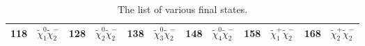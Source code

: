 \begin{table}[ht]
{\begin{tabular}{cccccccccccc}
            118 & $\widetilde{\chi}^{0}_{1} \widetilde{\chi}^{-}_{2}$ & 128 & $\widetilde{\chi}^{0}_{2} \widetilde{\chi}^{-}_{2}$ & 138 & $\widetilde{\chi}^{0}_{3} \widetilde{\chi}^{-}_{2}$ & 148 & $\widetilde{\chi}^{0}_{4} \widetilde{\chi}^{-}_{2}$ & 158 & $\widetilde{\chi}^{+}_{1} \widetilde{\chi}^{-}_{2}$ & 168 & $\widetilde{\chi}^{+}_{2} \widetilde{\chi}^{-}_{2}$\\
            \hline
            \hline
        \end{tabular}
    }
    \caption{The list of various final states.}
    \label{tab:app_xsec_final_state}
\end{table}%
